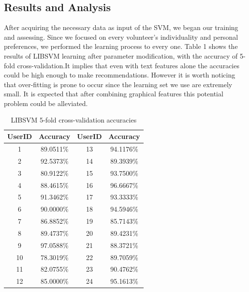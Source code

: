 


\subsection{Results and Analysis}
After acquiring the necessary data as input of the SVM, we began our training and assessing. Since we focused on every volunteer's individuality and personal preferences, we performed  the learning process to every one. 
Table 1 shows the results of LIBSVM learning after parameter modification, with the accuracy of 5-fold cross-validation.It implies that even with text features alone the accuracies could be high enough to make recommendations. However it is worth noticing that over-fitting is prone to occur since the learning set we use are extremely small. It is expected that after combining graphical features this potential problem could be alleviated. 

\begin{table}
  \centering  %
  \begin{tabular}{c c | c c} %
    \hline                        %
    UserID & Accuracy & UserID & Accuracy \\ [0.9ex] %
    \hline                  %
    1 & 89.0511\% & 13 & 94.1176\% \\
    2 & 92.5373\% & 14 & 89.3939\% \\
    3 & 80.9122\% & 15 & 93.7500\% \\
    4 & 88.4615\% & 16 & 96.6667\% \\
    5 & 91.3462\% & 17 & 93.3333\% \\
    6 & 90.0000\% & 18 & 94.5946\% \\
    7 & 86.8852\% & 19 & 85.7143\% \\
    8 & 89.4737\% & 20 & 89.4231\% \\
    9 & 97.0588\% & 21 & 88.3721\% \\
    10 & 78.3019\% & 22 & 89.7059\% \\
    11 & 82.0755\% & 23 & 90.4762\% \\
    12 & 85.0000\% & 24 & 95.1613\% \\[1ex]  
    \hline %
  \end{tabular}
  \caption{LIBSVM 5-fold cross-validation accuracies} %
  \label{table:nonlin} %
\end{table}
